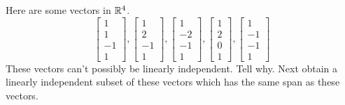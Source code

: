 \documentclass{ximera}
\begin{document}
\begin{problem}\label{prb:3.25} Here are some vectors in $\mathbb{R}^{4}$.
\begin{equation*}
\left[
\begin{array}{r}
1 \\
1 \\
-1 \\
1
\end{array}
\right] ,\left[
\begin{array}{r}
1 \\
2 \\
-1 \\
1
\end{array}
\right] ,\left[
\begin{array}{r}
1 \\
-2 \\
-1 \\
1
\end{array}
\right] ,\left[
\begin{array}{r}
1 \\
2 \\
0 \\
1
\end{array}
\right] ,\left[
\begin{array}{r}
1 \\
-1 \\
-1 \\
1
\end{array}
\right]
\end{equation*}
These vectors can't possibly be linearly independent. Tell why. Next obtain a
linearly independent subset of these vectors which has the same span as
these vectors. 
\end{problem}
\end{document}
